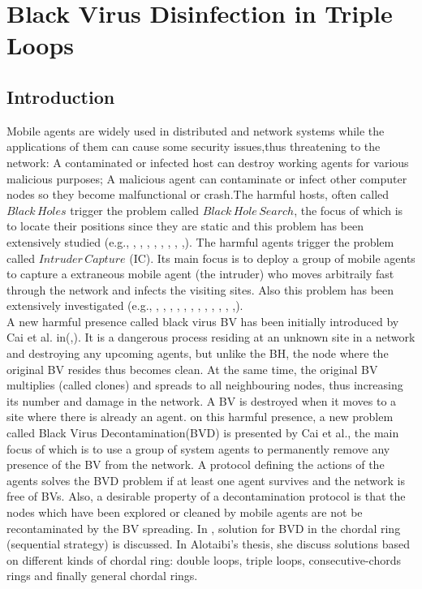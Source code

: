 


\chapter {Black Virus Disinfection in Triple Loops}
\label{TL}
 

\section{Introduction}
Mobile agents are widely used in distributed and network systems while the applications of them can cause some security issues,thus threatening to the network: A contaminated or infected host can destroy working agents for various malicious purposes; A malicious agent can contaminate or infect other computer nodes so they become malfunctional or crash.The harmful hosts, often called $Black\,Holes$ trigger the problem called $Black\,Hole\,Search$, the focus of which is to locate their positions since they are static and this problem has been extensively studied (e.g., \cite{EE1}, \cite{EE2}, \cite{EE3}, \cite{EE4}, \cite{EE5}, \cite{EE6}, \cite{EE7}, \cite{EE8},). The harmful agents trigger the problem called $Intruder\,Capture$ (IC). Its main focus is to deploy a group of mobile agents to capture a extraneous mobile agent (the intruder) who moves arbitraily fast through the network and infects the visiting sites. Also this problem has been extensively investigated (e.g.,  \cite{EF1}, \cite{EF2}, \cite{EF3}, \cite{EF4}, \cite{EF5}, \cite{EF6}, \cite{EF7}, \cite{EF8}, \cite{EF9}, \cite{EFa}, \cite{EFb}, \cite{EFc},). \\
A new harmful presence called black virus BV has been initially introduced by Cai et al. in(\cite{EG1},). It is a dangerous process residing at an unknown site in a network and destroying any upcoming agents, but unlike the BH, the node where the original BV resides thus becomes clean. At the same time, the original BV multiplies (called clones) and spreads to all neighbouring nodes, thus increasing its number and damage in the network. A BV is destroyed when it moves to a site where there is already an agent. on this harmful presence, a new problem called Black Virus Decontamination(BVD) is presented by Cai et al., the main focus of which is to use a group of system agents to permanently remove any presence of the BV from the network. A protocol defining the actions of the agents solves the BVD problem if at least one agent survives and the network is free of BVs. Also, a desirable property of a decontamination protocol is that the nodes which have been explored or cleaned by mobile agents are not be recontaminated by the BV spreading. In \cite{EH1}, solution for BVD in the chordal ring (sequential strategy) is discussed. In Alotaibi's thesis, she discuss solutions based on different kinds of chordal ring: double loops, triple loops, consecutive-chords rings and finally general chordal rings. \\
